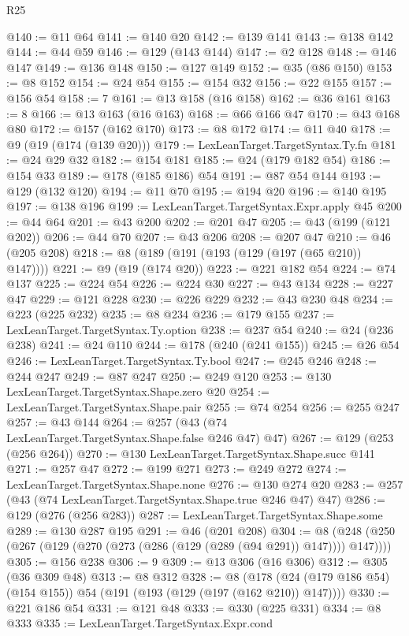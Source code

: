 \begin{lexlean}{R25}
\begin{coremodule}
@140 := @11 @64
@141 := @140 @20
@142 := @139 @141
@143 := @138 @142
@144 := @44 @59
@146 := @129 (@143 @144)
@147 := @2 @128
@148 := @146 @147
@149 := @136 @148
@150 := @127 @149
@152 := @35 (@86 @150)
@153 := @8 @152
@154 := @24 @54
@155 := @154 @32
@156 := @22 @155
@157 := @156 @54
@158 := 7
@161 := @13 @158 (@16 @158)
@162 := @36 @161
@163 := 8
@166 := @13 @163 (@16 @163)
@168 := @66 @166 @47
@170 := @43 @168 @80
@172 := @157 (@162 @170)
@173 := @8 @172
@174 := @11 @40
@178 := @9 (@19 (@174 (@139 @20)))
@179 := LexLeanTarget.TargetSyntax.Ty.fn
@181 := @24 @29 @32
@182 := @154 @181
@185 := @24 (@179 @182 @54)
@186 := @154 @33
@189 := @178 (@185 @186) @54
@191 := @87 @54 @144
@193 := @129 (@132 @120)
@194 := @11 @70
@195 := @194 @20
@196 := @140 @195
@197 := @138 @196
@199 := LexLeanTarget.TargetSyntax.Expr.apply @45
@200 := @44 @64
@201 := @43 @200
@202 := @201 @47
@205 := @43 (@199 (@121 @202))
@206 := @44 @70
@207 := @43 @206
@208 := @207 @47
@210 := @46 (@205 @208)
@218 := @8 (@189 (@191 (@193 (@129 (@197 (@65 @210)) @147))))
@221 := @9 (@19 (@174 @20))
@223 := @221 @182 @54
@224 := @74 @137
@225 := @224 @54
@226 := @224 @30
@227 := @43 @134
@228 := @227 @47
@229 := @121 @228
@230 := @226 @229
@232 := @43 @230 @48
@234 := @223 (@225 @232)
@235 := @8 @234
@236 := @179 @155
@237 := LexLeanTarget.TargetSyntax.Ty.option
@238 := @237 @54
@240 := @24 (@236 @238)
@241 := @24 @110
@244 := @178 (@240 (@241 @155))
@245 := @26 @54
@246 := LexLeanTarget.TargetSyntax.Ty.bool
@247 := @245 @246
@248 := @244 @247
@249 := @87 @247
@250 := @249 @120
@253 := @130 LexLeanTarget.TargetSyntax.Shape.zero @20
@254 := LexLeanTarget.TargetSyntax.Shape.pair
@255 := @74 @254
@256 := @255 @247
@257 := @43 @144
@264 := @257 (@43 (@74 LexLeanTarget.TargetSyntax.Shape.false @246 @47) @47)
@267 := @129 (@253 (@256 @264))
@270 := @130 LexLeanTarget.TargetSyntax.Shape.succ @141
@271 := @257 @47
@272 := @199 @271
@273 := @249 @272
@274 := LexLeanTarget.TargetSyntax.Shape.none
@276 := @130 @274 @20
@283 := @257 (@43 (@74 LexLeanTarget.TargetSyntax.Shape.true @246 @47) @47)
@286 := @129 (@276 (@256 @283))
@287 := LexLeanTarget.TargetSyntax.Shape.some
@289 := @130 @287 @195
@291 := @46 (@201 @208)
@304 := @8 (@248 (@250 (@267 (@129 (@270 (@273 (@286 (@129 (@289 (@94 @291)) @147)))) @147))))
@305 := @156 @238
@306 := 9
@309 := @13 @306 (@16 @306)
@312 := @305 (@36 @309 @48)
@313 := @8 @312
@328 := @8 (@178 (@24 (@179 @186 @54) (@154 @155)) @54 (@191 (@193 (@129 (@197 (@162 @210)) @147))))
@330 := @221 @186 @54
@331 := @121 @48
@333 := @330 (@225 @331)
@334 := @8 @333
@335 := LexLeanTarget.TargetSyntax.Expr.cond

\end{coremodule}
\end{lexlean}
